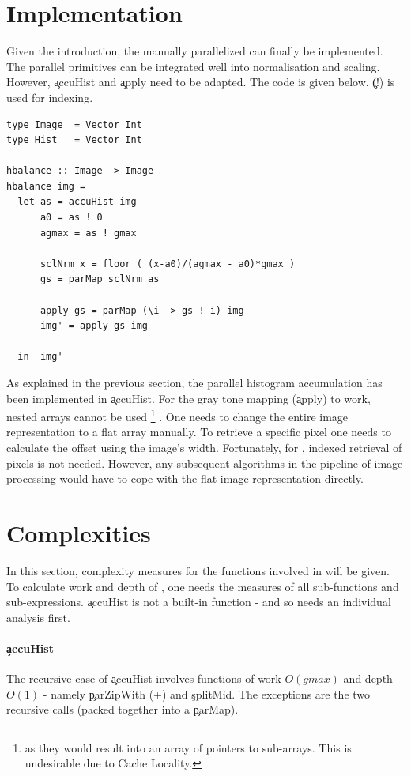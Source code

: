 \section{Implementation}
  Given the introduction, the manually parallelized \man can finally be implemented.
  The parallel primitives can be integrated
  well into normalisation and scaling.
  However, \c{accuHist} and \c{apply} need to be adapted.
  The code is given below. \c{(!)} is used for indexing.
  \begin{lstlisting}
type Image  = Vector Int
type Hist   = Vector Int

hbalance :: Image -> Image
hbalance img =
  let as = accuHist img
      a0 = as ! 0
      agmax = as ! gmax
      
      sclNrm x = floor ( (x-a0)/(agmax - a0)*gmax )
      gs = parMap sclNrm as
      
      apply gs = parMap (\i -> gs ! i) img
      img' = apply gs img
      
  in  img'
  \end{lstlisting}
  As explained in the previous section, the parallel
  histogram accumulation has been implemented in \c{accuHist}.
  For the gray tone mapping (\c{apply}) to work, nested arrays cannot be used
  \footnote{as they would result into an array of pointers to sub-arrays.
  This is undesirable due to Cache Locality.}
  .
  One needs to change the entire image representation to a flat array manually.
  To retrieve a specific pixel one needs to calculate
  the offset using the image's width. Fortunately,
  for \algo, indexed retrieval of pixels is not needed.
  However, any subsequent algorithms in the pipeline of image processing
  would have to cope with the flat image representation directly.
    
\section{Complexities}
  In this section, complexity measures for the functions
  involved in \man will be given.
  To calculate work and depth of \man, one needs the measures of
  all sub-functions and sub-expressions. \c{accuHist} is
  not a built-in function - and so needs an individual analysis first.
  
  \paragraph{\c{accuHist}}
    The recursive case of \c{accuHist} involves functions
    of work $O(gmax)$ and depth $O(1)$ - 
    namely \c{parZipWith (+)} and \c{splitMid}.
    The exceptions are the two recursive calls (packed together into a
    \c{parMap}).
    
